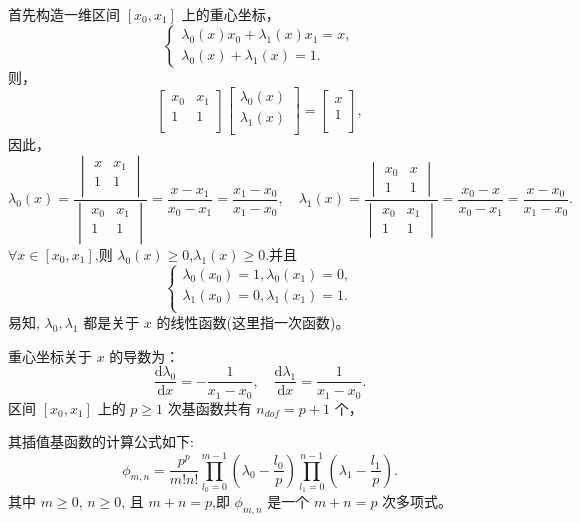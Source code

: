 \documentclass[12pt,a4paper]{article}
\begin{document}
首先构造一维区间 $[x_0,x_1]$ 上的重心坐标，
$$
\begin{cases}
\lambda _0(x)x_0+\lambda _1(x)x_1=x,\\
\lambda _0(x)+\lambda _1(x)=1.
\end{cases}
$$
则，
$$
\begin{bmatrix}
x_0 & x_1\\
1 & 1\\
\end{bmatrix}
\begin{bmatrix}
\lambda _0(x)\\
\lambda _1(x)\\
\end{bmatrix}=\begin{bmatrix}
x\\
1\\
\end{bmatrix},
$$
因此，
$$
\lambda _0(x)=\frac{\begin{vmatrix}
x & x_1 \\
1 & 1 \\
\end{vmatrix}}{\begin{vmatrix}
x_0 & x_1 \\
1 & 1 \\
\end{vmatrix}}=\frac{x-x_1}{x_0-x_1}=\frac{x_1-x_0}{x_1-x_0},
\quad\lambda _1(x)=\frac{\begin{vmatrix}
x_0 & x \\
1 & 1
\end{vmatrix}}{\begin{vmatrix}
x_0 & x_1 \\
1 & 1
\end{vmatrix}}=\frac{x_0-x}{x_0-x_1}=\frac{x-x_0}{x_1-x_0}.
$$
$\forall x\in [x_0,x_1]$,则 $\lambda _0(x)\ge 0$,$\lambda _1(x)\ge 0$.并且
$$
\begin{cases}
\lambda _0 (x_0)=1,\lambda _0 (x_1)=0,\\
\lambda _1 (x_0)=0,\lambda _1 (x_1)=1.\\
\end{cases}
$$
易知, $\lambda_0, \lambda_1$ 都是关于 $x$ 的线性函数(这里指一次函数)。

重心坐标关于 $x$ 的导数为：
$$
\frac{\mathrm d \lambda_0}{\mathrm dx} = -\frac{1}{x_1 - x_0},\quad 
\frac{\mathrm d \lambda_1}{\mathrm dx} = \frac{1}{x_1 - x_0}.
$$
区间 $[x_0, x_1]$ 上的 $p\geq 1$ 次基函数共有 
$n_{dof} = p+1$ 个，

其插值基函数的计算公式如下:
$$
\phi_{m,n} = \frac{p^p}{m!n!}\prod_{l_0 = 0}^{m - 1}
(\lambda_0 - \frac{l_0}{p}) \prod_{l_1 = 0}^{n-1}(\lambda_1 -
\frac{l_1}{p}).
$$
其中 $m\geq 0$, $n\geq 0$, 且 $m+n=p$,即 $\phi_{m,n}$ 是一个 $m+n=p$ 次多项式。
\end{document}
